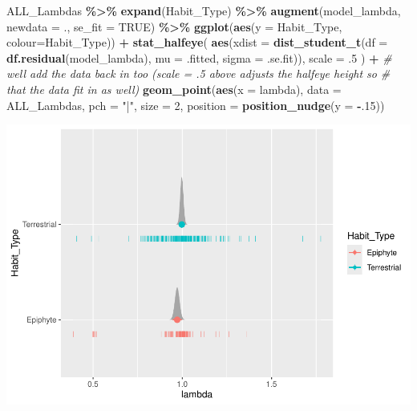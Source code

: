 \documentclass[
]{book}
\newenvironment{Shaded}{\begin{snugshade}}{\end{snugshade}}
\newcommand{\AttributeTok}[1]{\textcolor[rgb]{0.13,0.29,0.53}{#1}}
\newcommand{\CommentTok}[1]{\textcolor[rgb]{0.56,0.35,0.01}{\textit{#1}}}
\newcommand{\ConstantTok}[1]{\textcolor[rgb]{0.56,0.35,0.01}{#1}}
\newcommand{\DecValTok}[1]{\textcolor[rgb]{0.00,0.00,0.81}{#1}}
\newcommand{\FunctionTok}[1]{\textcolor[rgb]{0.13,0.29,0.53}{\textbf{#1}}}
\newcommand{\NormalTok}[1]{#1}
\newcommand{\SpecialCharTok}[1]{\textcolor[rgb]{0.81,0.36,0.00}{\textbf{#1}}}
\newcommand{\StringTok}[1]{\textcolor[rgb]{0.31,0.60,0.02}{#1}}
\theoremstyle{definition}
\theoremstyle{definition}
\theoremstyle{definition}
\theoremstyle{definition}
\theoremstyle{remark}
\begin{document}
\begin{Shaded}
\begin{Highlighting}[]
\NormalTok{ALL\_Lambdas }\SpecialCharTok{\%\textgreater{}\%}
  \FunctionTok{expand}\NormalTok{(Habit\_Type) }\SpecialCharTok{\%\textgreater{}\%}
  \FunctionTok{augment}\NormalTok{(model\_lambda, }\AttributeTok{newdata =}\NormalTok{ ., }\AttributeTok{se\_fit =} \ConstantTok{TRUE}\NormalTok{) }\SpecialCharTok{\%\textgreater{}\%}
  \FunctionTok{ggplot}\NormalTok{(}\FunctionTok{aes}\NormalTok{(}\AttributeTok{y =}\NormalTok{ Habit\_Type, }\AttributeTok{colour=}\NormalTok{Habit\_Type)) }\SpecialCharTok{+}
  \FunctionTok{stat\_halfeye}\NormalTok{(}
    \FunctionTok{aes}\NormalTok{(}\AttributeTok{xdist =} \FunctionTok{dist\_student\_t}\NormalTok{(}\AttributeTok{df =} \FunctionTok{df.residual}\NormalTok{(model\_lambda), }\AttributeTok{mu =}\NormalTok{ .fitted, }\AttributeTok{sigma =}\NormalTok{ .se.fit)),}
    \AttributeTok{scale =}\NormalTok{ .}\DecValTok{5}
\NormalTok{  ) }\SpecialCharTok{+}
  \CommentTok{\# we\textquotesingle{}ll add the data back in too (scale = .5 above adjusts the halfeye height so}
  \CommentTok{\# that the data fit in as well)}
  \FunctionTok{geom\_point}\NormalTok{(}\FunctionTok{aes}\NormalTok{(}\AttributeTok{x =}\NormalTok{ lambda), }\AttributeTok{data =}\NormalTok{ ALL\_Lambdas, }\AttributeTok{pch =} \StringTok{"|"}\NormalTok{, }\AttributeTok{size =} \DecValTok{2}\NormalTok{, }\AttributeTok{position =} \FunctionTok{position\_nudge}\NormalTok{(}\AttributeTok{y =} \SpecialCharTok{{-}}\NormalTok{.}\DecValTok{15}\NormalTok{))}
\end{Highlighting}
\end{Shaded}

\includegraphics{Diagnostico_Poblacional_files/figure-latex/unnamed-chunk-28-1.pdf}
\end{document}
